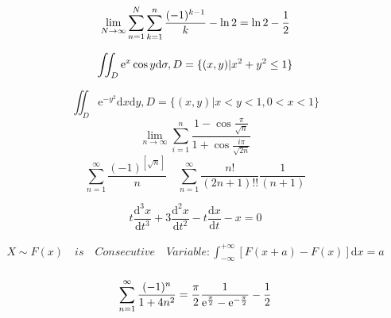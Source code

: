 \documentclass{article}
\begin{document}
\begin{displaymath}
    \lim_{N \to \infty}\sum_{n=1}^N\sum_{k=1}^n\frac{(-1)^{k-1}}{k}-\ln 2  = \ln 2-\frac{1}{2} \newline 
\end{displaymath}

\begin{displaymath}
    \iint_{D}\mathrm{e}^{x}\cos y\mathrm{d}\sigma, D=\{(x,y)|x^2+y^2 \le 1\} \\  
\end{displaymath}

\begin{displaymath}
    \iint_{D}\mathrm{e}^{-y^{2}}\mathrm{d}x\mathrm{d}y,D = \{(x,y)|x < y < 1,0<x<1\}
\end{displaymath}
\begin{displaymath}
    \lim_{n \to \infty}\sum_{i=1}^{n}\frac{1-\cos\frac{\pi}{\sqrt{n}}}{1+\cos\frac{i\pi}{\sqrt{2n}}}
\end{displaymath}
\begin{displaymath}
    \sum_{n=1 }^\infty \frac{(-1)^{[\sqrt{n}]}}{n} \quad 
    \sum_{n=1}^{\infty} \frac{n!}{(2n+1)!!}\frac{1}{(n+1)} 
\end{displaymath}

\begin{displaymath}
    t\frac{\mathrm{d}^3x}{\mathrm{d}t^3} + 3\frac{\mathrm{d}^2x}{\mathrm{d}t^2}-t\frac{\mathrm{d}x}{\mathrm{d}t}-x = 0
\end{displaymath}

\begin{align*}
    X \sim F(x) \quad is \quad Consecutive \quad Variable : \int_{-\infty}^{+\infty}[F(x+a)-F(x)]\mathrm{d}x = a \\ 
\end{align*}

\begin{displaymath}
    \sum_{n=1}^{\infty} \frac{(-1)^n}{1+4n^2} = \frac{\pi}{2}\frac{1}{\mathrm{e}^{\frac{\pi}{2}}-\mathrm{e}^{-\frac{\pi}{2}}}-\frac{1}{2} \\ 
\end{displaymath}
\end{document}
